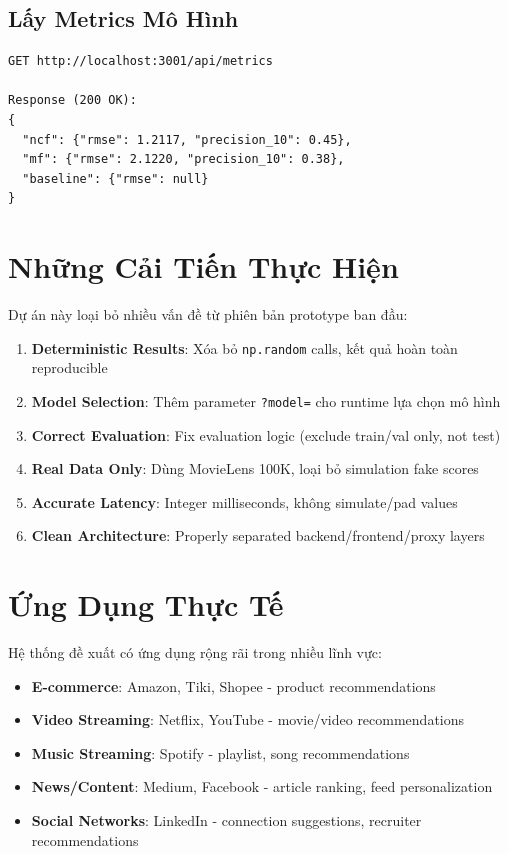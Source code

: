 \documentclass[12pt,a4paper]{article}
\begin{document}
\subsection{Lấy Metrics Mô Hình}

\begin{lstlisting}
GET http://localhost:3001/api/metrics

Response (200 OK):
{
  "ncf": {"rmse": 1.2117, "precision_10": 0.45},
  "mf": {"rmse": 2.1220, "precision_10": 0.38},
  "baseline": {"rmse": null}
}
\end{lstlisting}

\section{Những Cải Tiến Thực Hiện}

Dự án này loại bỏ nhiều vấn đề từ phiên bản prototype ban đầu:

\begin{enumerate}
    \item \textbf{Deterministic Results}: Xóa bỏ \texttt{np.random} calls, kết quả hoàn toàn reproducible
    \item \textbf{Model Selection}: Thêm parameter \texttt{?model=} cho runtime lựa chọn mô hình
    \item \textbf{Correct Evaluation}: Fix evaluation logic (exclude train/val only, not test)
    \item \textbf{Real Data Only}: Dùng MovieLens 100K, loại bỏ simulation fake scores
    \item \textbf{Accurate Latency}: Integer milliseconds, không simulate/pad values
    \item \textbf{Clean Architecture}: Properly separated backend/frontend/proxy layers
\end{enumerate}

\section{Ứng Dụng Thực Tế}

Hệ thống đề xuất có ứng dụng rộng rãi trong nhiều lĩnh vực:

\begin{itemize}
    \item \textbf{E-commerce}: Amazon, Tiki, Shopee - product recommendations
    \item \textbf{Video Streaming}: Netflix, YouTube - movie/video recommendations
    \item \textbf{Music Streaming}: Spotify - playlist, song recommendations
    \item \textbf{News/Content}: Medium, Facebook - article ranking, feed personalization
    \item \textbf{Social Networks}: LinkedIn - connection suggestions, recruiter recommendations
\end{itemize}
\end{document}
